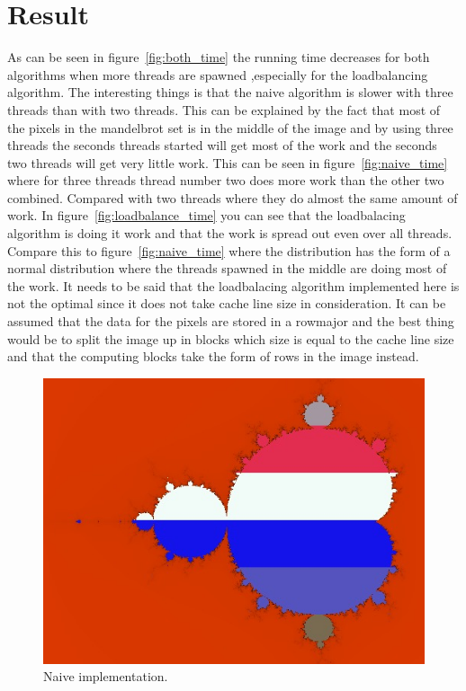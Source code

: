 \documentclass[10pt,twocolumn]{article}
\begin{document}
\section{Result}
As can be seen in figure~\ref{fig:both_time} the running time decreases for both algorithms when more threads are spawned ,especially for the loadbalancing algorithm. The interesting things is that the naive algorithm is slower with three threads than with two threads. This can be explained by the fact that most of the pixels in the mandelbrot set is in the middle of the image and by using three threads the seconds threads started will get most of the work and the seconds two threads will get very little work. This can be seen in figure~\ref{fig:naive_time} where for three threads thread number two does more work than the other two combined. Compared with two threads where they do almost the same amount of work. 
\newline
\newline
In figure~\ref{fig:loadbalance_time} you can see that the loadbalacing algorithm is doing it work and that the work is spread out even over all threads. Compare this to figure~\ref{fig:naive_time} where the distribution has the form of a normal distribution where the threads spawned in the middle are doing most of the work. 
\newline
\newline
It needs to be said that the loadbalacing algorithm implemented here is not the optimal since it does not take cache line size in consideration. It can be assumed that the data for the pixels are stored in a rowmajor and the best thing would be to split the image up in blocks which size is equal to the cache line size and that the computing blocks take the form of rows in the image instead.
\newpage 

\begin{figure}[H]
	\begin{center}
		\includegraphics[scale=0.4]{figurer/naive.jpg}
	\end{center}
	\caption{Naive implementation.}
	\label{fig:naive}
\end{figure}
\end{document}

